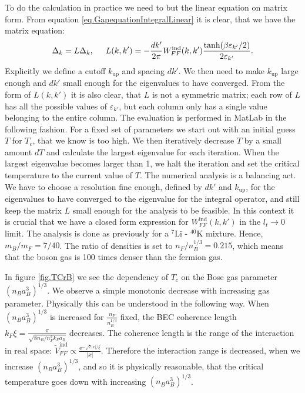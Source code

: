 To do the calculation in practice we need to but the linear equation on matrix form. From equation \eqref{eq.GapequationIntegralLinear} it is clear, that we have the matrix equation:
\begin{equation}
\Delta_k = L \Delta_k, \hspace{0.5cm} L(k,k') = -\frac{dk'}{2\pi} W^\text{ind}_{FF}(k,k')\frac{\tanh(\beta \varepsilon_{k'}/2)}{2\varepsilon_{k'}}. 
\label{eq.Gapmatrixequation}
\end{equation}
Explicitly we define a cutoff $k_{\text{up}}$ and spacing $dk'$. We then need to make $k_{\text{up}}$ large enough and $dk'$ small enough for the eigenvalues to have converged. From the form of $L(k,k')$ it is also clear, that $L$ is not a symmetric matrix; each row of $L$ has all the possible values of $\varepsilon_{k'}$, but each column only has a single value belonging to the entire column. The evaluation is performed in MatLab in the following fashion. For a fixed set of parameters we start out with an initial guess $T$ for $T_c$, that we know is too high. We then iteratively decrease $T$ by a small amount $dT$ and calculate the largest eigenvalue for each iteration. When the largest eigenvalue becomes larger than 1, we halt the iteration and set the critical temperature to the current value of $T$. The numerical analysis is a balancing act. We have to choose a resolution fine enough, defined by $dk'$ and $k_{\text{up}}$, for the eigenvalues to have converged to the eigenvalue for the integral operator, and still keep the matrix $L$ small enough for the analysis to be feasible. In this context it is crucial that we have a closed form expression for $W^\text{ind}_{FF}(k,k')$ in the $l_t \to 0$ limit. The analysis is done as previously for a $^{7}\text{Li}$ - $^{40}\text{K}$ mixture. Hence, $m_B/m_F = 7/40$. The ratio of densities is set to $n_F/{n_B^{1/3}} = 0.215$, which means that the boson gas is 100 times denser than the fermion gas. 

In figure \ref{fig.TCrB} we see the dependency of $T_c$ on the Bose gas parameter $(n_Ba_B^3)^{1/3}$. We observe a simple monotonic decrease with increasing gas parameter. Physically this can be understood in the following way. When $(n_Ba_B^3)^{1/3}$ is increased for $\frac{n_F}{n_B^{1/3}}$ fixed, the BEC coherence length $k_F\xi = \frac{\pi}{\sqrt{8 n_B/n_F^3 k_Fa_B}}$ decreases. The coherence length is the range of the interaction in real space: $\tilde{V}_{FF}^{\text{ind}} \propto \frac{ \text{e}^{ -\sqrt{2}|x|/\xi } } {|x|}$. Therefore the interaction range is decreased, when we increase $(n_Ba_B^3)^{1/3}$, and so it is physically reasonable, that the critical temperature goes down with increasing $(n_Ba_B^3)^{1/3}$.

